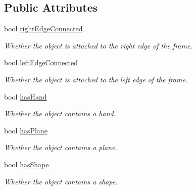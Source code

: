 \subsection*{Public Attributes}
\begin{DoxyCompactItemize}
\item 
bool \hyperlink{class_object3_d_aed51e0166d44e45976f1354317fc8dd5}{right\+Edge\+Connected}
\begin{DoxyCompactList}\small\item\em Whether the object is attached to the right edge of the frame. \end{DoxyCompactList}\item 
bool \hyperlink{class_object3_d_ac12ac80ceca7b3d6aa3d935956e6e04b}{left\+Edge\+Connected}
\begin{DoxyCompactList}\small\item\em Whether the object is attached to the left edge of the frame. \end{DoxyCompactList}\item 
bool \hyperlink{class_object3_d_a8cfee001a38488c0eeaa0a1333c1ba48}{has\+Hand}
\begin{DoxyCompactList}\small\item\em Whether the object contains a hand. \end{DoxyCompactList}\item 
bool \hyperlink{class_object3_d_a6a53bea872dadddc06e64ee6b7d7b238}{has\+Plane}
\begin{DoxyCompactList}\small\item\em Whether the object contains a plane. \end{DoxyCompactList}\item 
bool \hyperlink{class_object3_d_a00110e4274ca6e0f107e78e2e097d6d0}{has\+Shape}
\begin{DoxyCompactList}\small\item\em Whether the object contains a shape. \end{DoxyCompactList}\end{DoxyCompactItemize}
